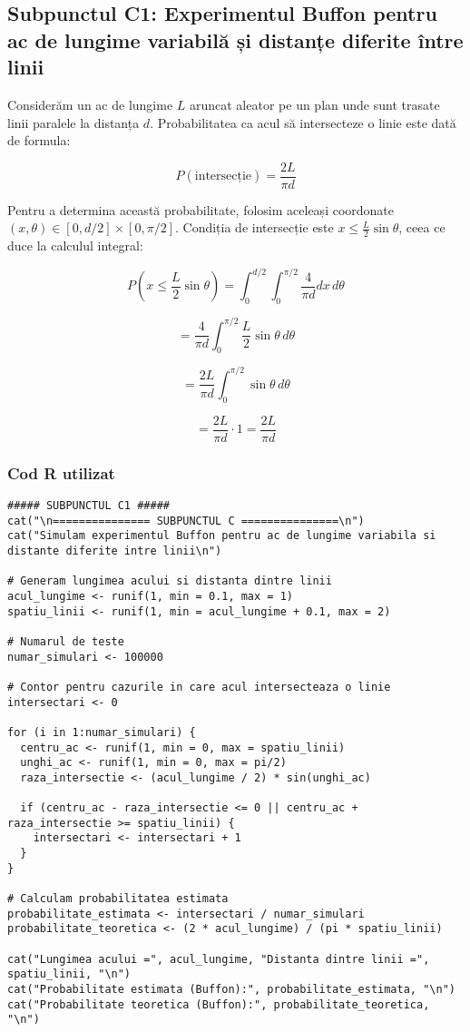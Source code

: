 \documentclass{article}
\begin{document}
\subsection{Subpunctul C1: Experimentul Buffon pentru ac de lungime variabilă și distanțe diferite între linii}

Considerăm un ac de lungime \( L \) aruncat aleator pe un plan unde sunt trasate linii paralele la distanța \( d \). Probabilitatea ca acul să intersecteze o linie este dată de formula:

\[
P(\text{intersecție}) = \frac{2L}{\pi d}
\]

Pentru a determina această probabilitate, folosim aceleași coordonate \((x, \theta) \in [0, d/2] \times [0, \pi/2]\). Condiția de intersecție este \( x \leq \frac{L}{2} \sin \theta \), ceea ce duce la calculul integral:

\[
P\left(x \leq \frac{L}{2} \sin \theta \right) = \int_0^{d/2} \int_0^{\pi/2} \frac{4}{\pi d} dx \, d\theta
\]

\[
= \frac{4}{\pi d} \int_0^{\pi/2} \frac{L}{2} \sin \theta \, d\theta
\]

\[
= \frac{2L}{\pi d} \int_0^{\pi/2} \sin \theta \, d\theta
\]

\[
= \frac{2L}{\pi d} \cdot 1 = \frac{2L}{\pi d}
\]

\newpage

\subsubsection*{Cod R utilizat}

\begin{lstlisting}
##### SUBPUNCTUL C1 #####
cat("\n=============== SUBPUNCTUL C ===============\n")
cat("Simulam experimentul Buffon pentru ac de lungime variabila si distante diferite intre linii\n")

# Generam lungimea acului si distanta dintre linii
acul_lungime <- runif(1, min = 0.1, max = 1)  
spatiu_linii <- runif(1, min = acul_lungime + 0.1, max = 2)  

# Numarul de teste
numar_simulari <- 100000

# Contor pentru cazurile in care acul intersecteaza o linie
intersectari <- 0

for (i in 1:numar_simulari) {
  centru_ac <- runif(1, min = 0, max = spatiu_linii)
  unghi_ac <- runif(1, min = 0, max = pi/2)
  raza_intersectie <- (acul_lungime / 2) * sin(unghi_ac)
  
  if (centru_ac - raza_intersectie <= 0 || centru_ac + raza_intersectie >= spatiu_linii) {
    intersectari <- intersectari + 1
  }
}

# Calculam probabilitatea estimata
probabilitate_estimata <- intersectari / numar_simulari
probabilitate_teoretica <- (2 * acul_lungime) / (pi * spatiu_linii)

cat("Lungimea acului =", acul_lungime, "Distanta dintre linii =", spatiu_linii, "\n")
cat("Probabilitate estimata (Buffon):", probabilitate_estimata, "\n")
cat("Probabilitate teoretica (Buffon):", probabilitate_teoretica, "\n")
\end{lstlisting}
\end{document}
